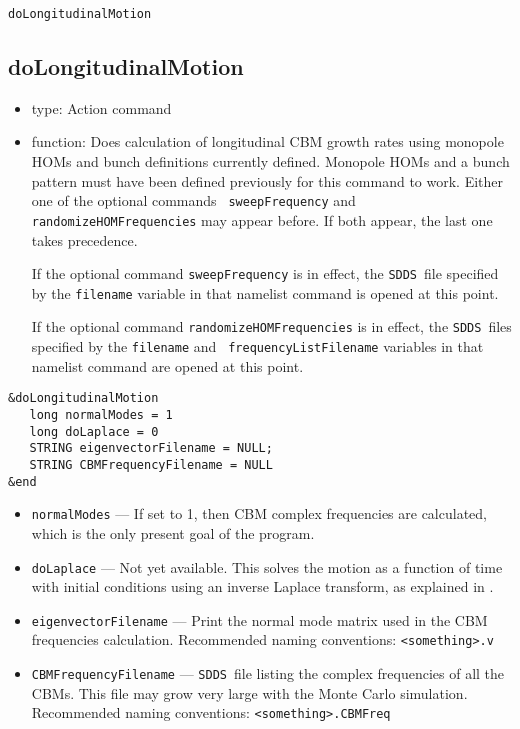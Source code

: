 \documentclass[11pt]{article}
\newcommand{\SDDS}{{\tt SDDS}}
\begin{document}
\newpage
\begin{center}\tt doLongitudinalMotion\end{center}
\subsection{doLongitudinalMotion}

\begin{itemize}
\item type: Action command
\item function: Does calculation of longitudinal CBM growth rates
using monopole HOMs and bunch definitions currently defined.  Monopole
HOMs and a bunch pattern must have been defined previously for this
command to work.  Either one of the optional commands {\tt
sweepFrequency} and {\tt randomizeHOMFrequencies} may appear before.  If both
appear, the last one takes precedence.

If the optional command {\tt sweepFrequency} is in effect, the
\SDDS\ file specified by the {\tt filename} variable in that namelist
command is opened at this point.

If the optional command {\tt randomizeHOMFrequencies} is in effect,
the \SDDS\ files specified by the {\tt filename} and {\tt
frequencyListFilename} variables in that namelist command are opened
at this point.
\end{itemize}
\begin{verbatim}
&doLongitudinalMotion
   long normalModes = 1
   long doLaplace = 0
   STRING eigenvectorFilename = NULL;
   STRING CBMFrequencyFilename = NULL
&end
\end{verbatim}
\begin{itemize}
\item {\tt normalModes} --- If set to 1, then CBM complex frequencies
        are calculated, which is the only present goal of the program.
\item {\tt doLaplace} --- Not yet available. This solves the motion
as a function of time with initial conditions using an inverse Laplace
transform, as explained in \cite{Thompson:PAC89}.
\item {\tt eigenvectorFilename} --- Print the normal
mode matrix used in the CBM frequencies calculation. Recommended
naming conventions: {\tt <something>.v}
\item {\tt CBMFrequencyFilename} --- \SDDS\ file listing the
complex frequencies of all the CBMs. This file may grow very large
with the Monte Carlo simulation.   Recommended
naming conventions: {\tt <something>.CBMFreq}

\end{itemize}
\end{document}
